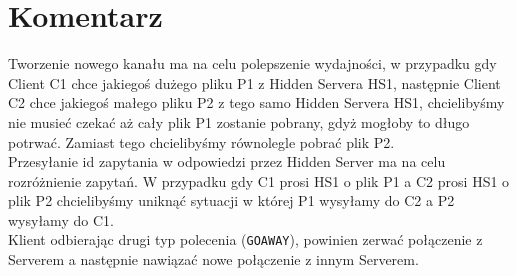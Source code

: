 \documentclass[a4paper,notitlepage]{article}
\begin{document}
\section{Komentarz}
Tworzenie nowego kanału ma na celu polepszenie wydajności, w przypadku gdy Client C1 chce jakiegoś dużego pliku P1 z Hidden Servera HS1, następnie Client C2 chce jakiegoś małego pliku P2 z tego samo Hidden Servera HS1, chcielibyśmy nie musieć czekać aż cały plik P1 zostanie pobrany, gdyż mogłoby to długo potrwać. Zamiast tego chcielibyśmy równolegle pobrać plik P2. \\
Przesyłanie id zapytania w odpowiedzi przez Hidden Server ma na celu rozróżnienie zapytań. W przypadku gdy C1 prosi HS1 o plik P1 a C2 prosi HS1 o plik P2 chcielibyśmy uniknąć sytuacji w której P1 wysyłamy do C2 a P2 wysyłamy do C1. \\
Klient odbierając drugi typ polecenia (\texttt{GOAWAY}), powinien zerwać połączenie z Serverem a następnie nawiązać nowe połączenie z innym Serverem.




   
\end{document}
